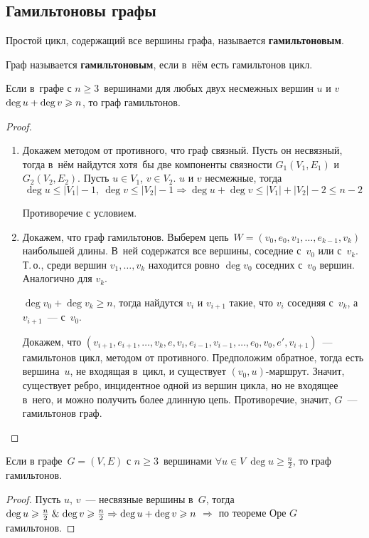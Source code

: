 \subsection{Гамильтоновы графы}
Простой цикл, содержащий все вершины графа, называется \textbf{гамильтоновым}.

 Граф называется \textbf{гамильтоновым}, если в~нём есть гамильтонов цикл.

\begin{theorem}[Оре]
Если в~графе с $n \geqslant 3$~вершинами для любых двух несмежных вершин $u$ и $v$ $\deg u \opbr+ \deg v \opbr\geqslant n$, то граф гамильтонов.
\end{theorem}
\begin{proof}
\begin{enumerate}
	\item Докажем методом от противного, что граф связный.
	Пусть он несвязный, тогда в~нём найдутся хотя~бы две компоненты связности $G_1(V_1, E_1)$ и $G_2(V_2, E_2)$.
	Пусть $u \in V_1$, $v \in V_2$.
	$u$ и $v$ несмежные, тогда
	\begin{equation*}
	\deg u \leqslant |V_1| - 1, \ \deg v \leqslant |V_2| - 1 \Rightarrow \deg u + \deg v \leqslant |V_1| + |V_2| - 2 \leqslant n - 2
	\end{equation*}
	
	Противоречие с условием.
	
	\item Докажем, что граф гамильтонов.
	Выберем цепь~$W = (v_0, e_0, v_1, \ldots, e_{k-1}, v_k)$ наибольшей длины.
	В~ней содержатся все вершины, соседние с~$v_0$ или с~$v_k$.
	Т.\,о., среди вершин $v_1, \ldots, v_k$ находится ровно $\deg v_0$ соседних с~$v_0$ вершин.
	Аналогично для $v_k$.
	
	$\deg v_0 + \deg v_k \geqslant n$, тогда найдутся $v_i$ и $v_{i+1}$ такие, что $v_i$ соседняя с~$v_k$, а $v_{i+1}$~--- с~$v_0$.
	
	Докажем, что $(v_{i+1}, e_{i+1}, \ldots, v_k, e, v_i, e_{i-1}, v_{i-1}, \ldots, e_0, v_0, e', v_{i+1})$~--- гамильтонов цикл, методом от противного.
	Предположим обратное, тогда есть вершина~$u$, не входящая в~цикл, и существует $(v_0, u)$-маршрут.
	Значит, существует ребро, инцидентное одной из вершин цикла, но не входящее в~него, и можно получить более длинную цепь.
	Противоречие, значит, $G$~--- гамильтонов граф.
\end{enumerate}
\end{proof}

\begin{theorem}[Дирака]
\label{th:Dirac}
Если в графе~$G = (V, E)$ с $n \geqslant 3$~вершинами $\forall u \in V \ \deg u \geqslant \frac{n}2$, то граф гамильтонов.
\end{theorem}
\begin{proof}
Пусть $u$, $v$~--- несвязные вершины в~$G$, тогда $\deg u \geqslant \frac{n}2 \mathrel{\&} \deg v \geqslant \frac{n}2 \Rightarrow \deg u + \deg v \geqslant n$ $\Rightarrow$ по теореме Оре $G$ гамильтонов.
\end{proof}

